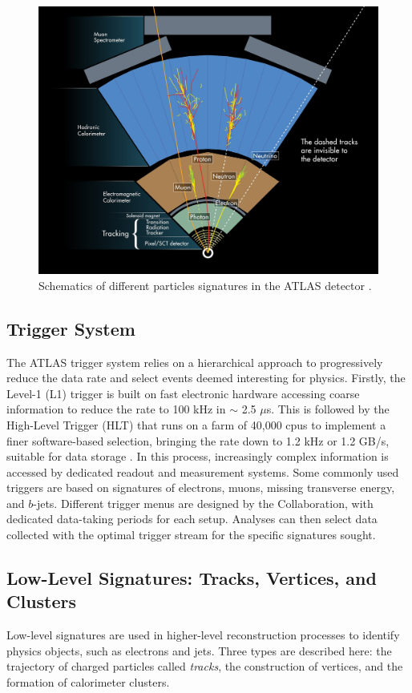 \begin{figure}[!h]
  \centering
  \includegraphics[width=\textwidth]{Images/ATLAS/ATLASdetection.jpg} %
  \caption{Schematics of different particles signatures in the ATLAS detector \cite{Pequenao:1505342}.}
  \label{fig-ATLASdetect}
\end{figure}

\subsection{Trigger System}\label{sub-sec-trigger}
The ATLAS trigger system relies on a hierarchical approach to progressively reduce the data rate and select events deemed interesting for physics. Firstly, the Level-1 (L1) trigger is built on fast electronic hardware accessing coarse information to reduce the rate to 100 kHz in $\sim$ 2.5 $\mu$s. This is followed by the High-Level Trigger (HLT) that runs on a farm of 40,000 \glspl{cpu} to implement a finer software-based selection, bringing the rate down to 1.2 kHz or 1.2 GB/s, suitable for data storage \cite{TriggerATLAScollaboration_2020}. In this process, increasingly complex information is accessed by dedicated readout and measurement systems. Some commonly used triggers are based on signatures of electrons, muons, missing transverse energy, and $b$-jets. Different trigger menus are designed by the Collaboration, with dedicated data-taking periods for each setup. Analyses can then select data collected with the optimal trigger stream for the specific signatures sought.

\subsection{Low-Level Signatures: Tracks, Vertices, and Clusters}\label{sec-atlas-lw}
Low-level signatures are used in higher-level reconstruction processes to identify physics objects, such as electrons and jets. Three types are described here: the trajectory of charged particles called \textit{tracks}, the construction of vertices, and the formation of calorimeter clusters. \\

